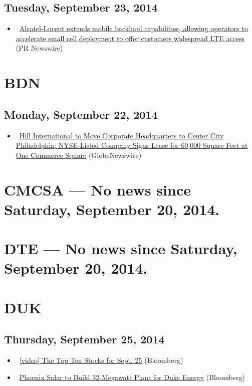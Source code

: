 \documentclass[11pt,asymmetric]{article}
\begin{document}
\subsection*{Tuesday, September 23, 2014}
\begin{itemize}
\item\ \href{http://finance.yahoo.com/news/alcatel-lucent-extends-mobile-backhaul-080000413.html}{Alcatel-Lucent extends mobile backhaul capabilities, allowing operators to accelerate small cell deployment to offer customers widespread LTE access} (PR Newswire)
\end{itemize}

\section*{BDN}

\subsection*{Monday, September 22, 2014}
\begin{itemize}
\item\ \href{http://finance.yahoo.com/news/hill-international-move-corporate-headquarters-140000728.html}{Hill International to Move Corporate Headquarters to Center City Philadelphia; NYSE-Listed Company Signs Lease for 60,000 Square Feet at One Commerce Square} (GlobeNewswire)
\end{itemize}

\section*{CMCSA --- No news since Saturday, September 20, 2014.}


\section*{DTE --- No news since Saturday, September 20, 2014.}


\section*{DUK}

\subsection*{Thursday, September 25, 2014}
\begin{itemize}
\item\ \href{http://www.bloomberg.com/video/bloomberg-s-top-ten-stocks-for-sept-25-ZpqfXqvTQ~S2hHri7dnYUA.html?cmpid=yhoo}{[video] The Top Ten Stocks for Sept. 25} (Bloomberg)
\item\ \href{http://www.bloomberg.com/news/2014-09-25/phoenix-solar-to-build-32-megawatt-plant-for-duke-energy.html?cmpid=yhoo}{Phoenix Solar to Build 32-Megawatt Plant for Duke Energy} (Bloomberg)
\end{itemize}
\end{document}
